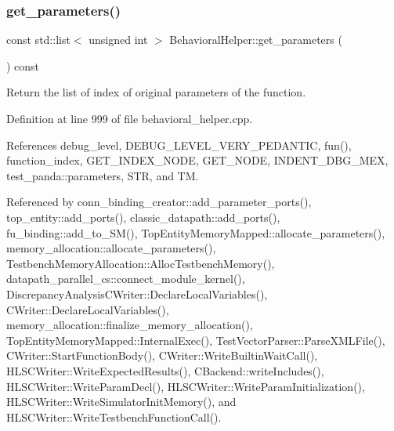 \subsubsection{\texorpdfstring{get\+\_\+parameters()}{get\_parameters()}}
{\footnotesize\ttfamily const std\+::list$<$ unsigned int $>$ Behavioral\+Helper\+::get\+\_\+parameters (\begin{DoxyParamCaption}{ }\end{DoxyParamCaption}) const}



Return the list of index of original parameters of the function. 



Definition at line 999 of file behavioral\+\_\+helper.\+cpp.



References debug\+\_\+level, D\+E\+B\+U\+G\+\_\+\+L\+E\+V\+E\+L\+\_\+\+V\+E\+R\+Y\+\_\+\+P\+E\+D\+A\+N\+T\+IC, fun(), function\+\_\+index, G\+E\+T\+\_\+\+I\+N\+D\+E\+X\+\_\+\+N\+O\+DE, G\+E\+T\+\_\+\+N\+O\+DE, I\+N\+D\+E\+N\+T\+\_\+\+D\+B\+G\+\_\+\+M\+EX, test\+\_\+panda\+::parameters, S\+TR, and TM.



Referenced by conn\+\_\+binding\+\_\+creator\+::add\+\_\+parameter\+\_\+ports(), top\+\_\+entity\+::add\+\_\+ports(), classic\+\_\+datapath\+::add\+\_\+ports(), fu\+\_\+binding\+::add\+\_\+to\+\_\+\+S\+M(), Top\+Entity\+Memory\+Mapped\+::allocate\+\_\+parameters(), memory\+\_\+allocation\+::allocate\+\_\+parameters(), Testbench\+Memory\+Allocation\+::\+Alloc\+Testbench\+Memory(), datapath\+\_\+parallel\+\_\+cs\+::connect\+\_\+module\+\_\+kernel(), Discrepancy\+Analysis\+C\+Writer\+::\+Declare\+Local\+Variables(), C\+Writer\+::\+Declare\+Local\+Variables(), memory\+\_\+allocation\+::finalize\+\_\+memory\+\_\+allocation(), Top\+Entity\+Memory\+Mapped\+::\+Internal\+Exec(), Test\+Vector\+Parser\+::\+Parse\+X\+M\+L\+File(), C\+Writer\+::\+Start\+Function\+Body(), C\+Writer\+::\+Write\+Builtin\+Wait\+Call(), H\+L\+S\+C\+Writer\+::\+Write\+Expected\+Results(), C\+Backend\+::write\+Includes(), H\+L\+S\+C\+Writer\+::\+Write\+Param\+Decl(), H\+L\+S\+C\+Writer\+::\+Write\+Param\+Initialization(), H\+L\+S\+C\+Writer\+::\+Write\+Simulator\+Init\+Memory(), and H\+L\+S\+C\+Writer\+::\+Write\+Testbench\+Function\+Call().

